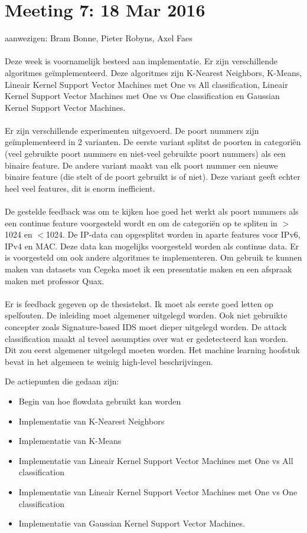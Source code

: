 \section{Meeting 7: 18 Mar 2016}
aanwezigen: Bram Bonne, Pieter Robyns, Axel Faes\\\\
Deze week is voornamelijk besteed aan implementatie. Er zijn verschillende algoritmes ge\"implementeerd. Deze algoritmes zijn K-Nearest Neighbors, K-Means, Lineair Kernel Support Vector Machines met One vs All classification, Lineair Kernel Support Vector Machines met One vs One classification en Gaussian Kernel Support Vector Machines. \\
\\
Er zijn verschillende experimenten uitgevoerd. De poort nummers zijn ge\"implementeerd in 2 varianten. De eerste variant splitst de poorten in categori\"en (veel gebruikte poort nummers en niet-veel gebruikte poort nummers) als een binaire feature. De andere variant maakt van elk poort nummer een nieuwe binaire feature (die stelt of de poort gebruikt is of niet). Deze variant geeft echter heel veel features, dit is enorm inefficient. \\
\\
De gestelde feedback was om te kijken hoe goed het werkt als poort nummers als een continue feature voorgesteld wordt en om de categori\"en op te spliten in $>$1024 en $<$1024. De IP-data can opgesplitst worden in aparte features voor IPv6, IPv4 en MAC. Deze data kan mogelijks voorgesteld worden als continue data. Er is voorgesteld om ook andere algoritmes te implementeren. Om gebruik te kunnen maken van datasets van Cegeka moet ik een presentatie maken en een afspraak maken met professor Quax. \\
\\
Er is feedback gegeven op de thesistekst. Ik moet als eerste goed letten op spelfouten. De inleiding moet algemener uitgelegd worden. Ook niet gebruikte concepter zoals Signature-based IDS moet dieper uitgelegd worden. De attack classification maakt al teveel assumpties over wat er gedetecteerd kan worden. Dit zou eerst algemener uitgelegd moeten worden. Het machine learning hoofstuk bevat in het algemeen te weinig high-level beschrijvingen. 

De actiepunten die gedaan zijn:
\begin{itemize}  
		\item Begin van hoe flowdata gebruikt kan worden
        \item Implementatie van K-Nearest Neighbors
        \item Implementatie van K-Means
        \item Implementatie van Lineair Kernel Support Vector Machines met One vs All classification
        \item Implementatie van Lineair Kernel Support Vector Machines met One vs One classification
        \item Implementatie van Gaussian Kernel Support Vector Machines.
\end{itemize}

